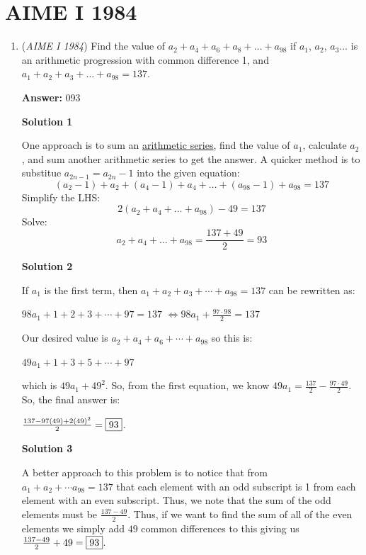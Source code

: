 \section{AIME I 1984}
        \begin{enumerate}
        	\item (\textit{AIME I 1984}) Find the value of $a_2+a_4+a_6+a_8+\ldots+a_{98}$ if $a_1$, $a_2$, $a_3\ldots$ is an arithmetic progression with common difference 1, and $a_1+a_2+a_3+\ldots+a_{98}=137$.


 
 \textbf{Answer: }093



\textbf{Solution 1}

One approach is to sum an \href{https://artofproblemsolving.com/wiki/index.php?title=Arithmetic\_series}{arithmetic series}, find the value of $a_1$, calculate $a_2$, and sum another arithmetic series to get the answer. A quicker method is to substitue $a_{2n - 1} = a_{2n} - 1$ into the given equation: 
 \[(a_2 - 1) + a_2 + (a_4 - 1) + a_4 + \ldots + (a_{98} - 1) + a_{98} = 137\]Simplify the LHS:
 \[2(a_2 + a_4 + \ldots + a_{98}) - 49= 137\]Solve:
 \[a_2 + a_4 + \ldots + a_{98}=\frac{137 + 49}{2} = \boxed{93}\]




\textbf{Solution 2}

If $a_1$ is the first term, then $a_1+a_2+a_3 + \cdots + a_{98} = 137$ can be rewritten as:

 $98a_1 + 1+2+3+ \cdots + 97 = 137$ $\Leftrightarrow$$98a_1 + \frac{97 \cdot 98}{2} = 137$

 Our desired value is $a_2+a_4+a_6+ \cdots + a_{98}$ so this is:

 $49a_1 + 1+3+5+ \cdots + 97$

 which is $49a_1+ 49^2$. So, from the first equation, we know $49a_1 = \frac{137}{2} - \frac{97 \cdot 49}{2}$. So, the final answer is:

 $\frac{137 - 97(49) + 2(49)^2}{2} = \fbox{93}$.

 



\textbf{Solution 3}

A better approach to this problem is to notice that from $a_{1}+a_{2}+\cdots a_{98}=137$ that each element with an odd subscript is 1 from each element with an even subscript. Thus, we note that the sum of the odd elements must be $\frac{137-49}{2}$. Thus, if we want to find the sum of all of the even elements we simply add $49$ common differences to this giving us $\frac{137-49}{2}+49=\fbox{93}$.


\end{enumerate}
